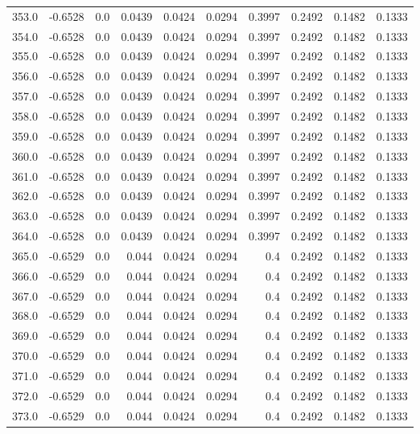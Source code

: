 \begin{longtable}{lrrrrrrrrr}
353.0 & -0.6528 & 0.0 & 0.0439 & 0.0424 & 0.0294 & 0.3997 & 0.2492 & 0.1482 & 0.1333 \\
354.0 & -0.6528 & 0.0 & 0.0439 & 0.0424 & 0.0294 & 0.3997 & 0.2492 & 0.1482 & 0.1333 \\
355.0 & -0.6528 & 0.0 & 0.0439 & 0.0424 & 0.0294 & 0.3997 & 0.2492 & 0.1482 & 0.1333 \\
356.0 & -0.6528 & 0.0 & 0.0439 & 0.0424 & 0.0294 & 0.3997 & 0.2492 & 0.1482 & 0.1333 \\
357.0 & -0.6528 & 0.0 & 0.0439 & 0.0424 & 0.0294 & 0.3997 & 0.2492 & 0.1482 & 0.1333 \\
358.0 & -0.6528 & 0.0 & 0.0439 & 0.0424 & 0.0294 & 0.3997 & 0.2492 & 0.1482 & 0.1333 \\
359.0 & -0.6528 & 0.0 & 0.0439 & 0.0424 & 0.0294 & 0.3997 & 0.2492 & 0.1482 & 0.1333 \\
360.0 & -0.6528 & 0.0 & 0.0439 & 0.0424 & 0.0294 & 0.3997 & 0.2492 & 0.1482 & 0.1333 \\
361.0 & -0.6528 & 0.0 & 0.0439 & 0.0424 & 0.0294 & 0.3997 & 0.2492 & 0.1482 & 0.1333 \\
362.0 & -0.6528 & 0.0 & 0.0439 & 0.0424 & 0.0294 & 0.3997 & 0.2492 & 0.1482 & 0.1333 \\
363.0 & -0.6528 & 0.0 & 0.0439 & 0.0424 & 0.0294 & 0.3997 & 0.2492 & 0.1482 & 0.1333 \\
364.0 & -0.6528 & 0.0 & 0.0439 & 0.0424 & 0.0294 & 0.3997 & 0.2492 & 0.1482 & 0.1333 \\
365.0 & -0.6529 & 0.0 & 0.044 & 0.0424 & 0.0294 & 0.4 & 0.2492 & 0.1482 & 0.1333 \\
366.0 & -0.6529 & 0.0 & 0.044 & 0.0424 & 0.0294 & 0.4 & 0.2492 & 0.1482 & 0.1333 \\
367.0 & -0.6529 & 0.0 & 0.044 & 0.0424 & 0.0294 & 0.4 & 0.2492 & 0.1482 & 0.1333 \\
368.0 & -0.6529 & 0.0 & 0.044 & 0.0424 & 0.0294 & 0.4 & 0.2492 & 0.1482 & 0.1333 \\
369.0 & -0.6529 & 0.0 & 0.044 & 0.0424 & 0.0294 & 0.4 & 0.2492 & 0.1482 & 0.1333 \\
370.0 & -0.6529 & 0.0 & 0.044 & 0.0424 & 0.0294 & 0.4 & 0.2492 & 0.1482 & 0.1333 \\
371.0 & -0.6529 & 0.0 & 0.044 & 0.0424 & 0.0294 & 0.4 & 0.2492 & 0.1482 & 0.1333 \\
372.0 & -0.6529 & 0.0 & 0.044 & 0.0424 & 0.0294 & 0.4 & 0.2492 & 0.1482 & 0.1333 \\
373.0 & -0.6529 & 0.0 & 0.044 & 0.0424 & 0.0294 & 0.4 & 0.2492 & 0.1482 & 0.1333 \\

\end{longtable}
